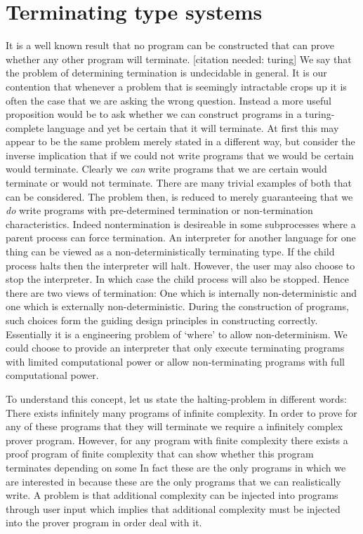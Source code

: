 \documentclass[11pt]{article}
\begin{document}
\section*{Terminating type systems}
It is a well known result that no program can be constructed that can prove whether any other program will terminate. [citation needed: turing]
We say that the problem of determining termination is undecidable in general.
It is our contention that whenever a problem that is seemingly intractable crops up it is often the case that we are asking the wrong question.
Instead a more useful proposition would be to ask whether we can construct programs in a turing-complete language and yet be certain that it will terminate.
At first this may appear to be the same problem merely stated in a different way, but consider the inverse implication that if we could not write programs that we would be certain would terminate.
Clearly we \emph{can} write programs that we are certain would terminate or would not terminate. 
There are many trivial examples of both that can be considered.
The problem then, is reduced to merely guaranteeing that we \emph{do} write programs with pre-determined termination or non-termination characteristics.
Indeed nontermination is desireable in some subprocesses where a parent process can force termination. 
An interpreter for another language for one thing can be viewed as a non-deterministically terminating type. 
If the child process halts then the interpreter will halt. 
However, the user may also choose to stop the interpreter. In which case the child process will also be stopped.
Hence there are two views of termination: One which is internally non-deterministic and one which is externally non-deterministic.
During the construction of programs, such choices form the guiding design principles in constructing correctly.
Essentially it is a engineering problem of `where' to allow non-determinism. We could choose to provide an interpreter that only execute terminating programs with limited computational power or allow non-terminating 
programs with full computational power.

To understand this concept, let us state the halting-problem in different words:
There exists infinitely many programs of infinite complexity. In order to prove for any of these programs that they will terminate we require a infinitely complex prover program.
However, for any program with finite complexity there exists a proof program of finite complexity that can show whether this program terminates depending on some 
In fact these are the only programs in which we are interested in because these are the only programs that we can realistically write. 
A problem is that additional complexity can be injected into programs through user input which implies that additional complexity must be injected into the prover program in order deal with it.
\end{document}
